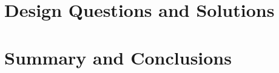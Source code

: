 
\newpage\section{Design Questions and Solutions}


\newpage\section{Summary and Conclusions}


\newpage{}



